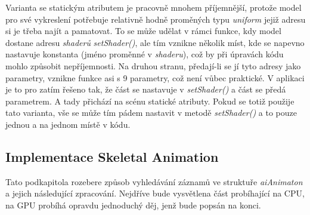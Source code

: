  Varianta se statickým atributem je pracovně mnohem příjemnější, protože model pro své vykreslení potřebuje relativně hodně proměných typu \emph{uniform} jejiž adresu si je třeba najít a pamatovat. To se může udělat v rámci funkce, kdy model dostane adresu \emph{shaderů} \emph{setShader()}, ale tím vznikne několik míst, kde se napevno nastavuje konstanta (jméno proměnné v \emph{shaderu}), což by při úpravách kódu mohlo způsobit nepříjemnosti. Na druhou stranu, předají-li se jí tyto adresy jako parametry, vznikne funkce asi s 9 parametry, což není vůbec praktické. V aplikaci je to pro zatím řešeno tak, že část se nastavuje v \emph{setShader()} a část se předá parametrem. A tady přichází na scénu statické atributy. Pokud se totiž použije tato varianta, vše se může tím pádem nastavit v metodě \emph{setShader()} a to pouze jednou a na jednom místě v kódu. 

\subsection{Implementace Skeletal Animation}\label{SA-I}
Tato podkapitola rozebere způsob vyhledávání záznamů ve struktuře \emph{aiAnimaton} a jejich následující zpracování. Nejdříve bude vysvětlena část probíhající na CPU, na GPU probíhá opravdu jednoduchý děj, jenž bude popsán na konci.

